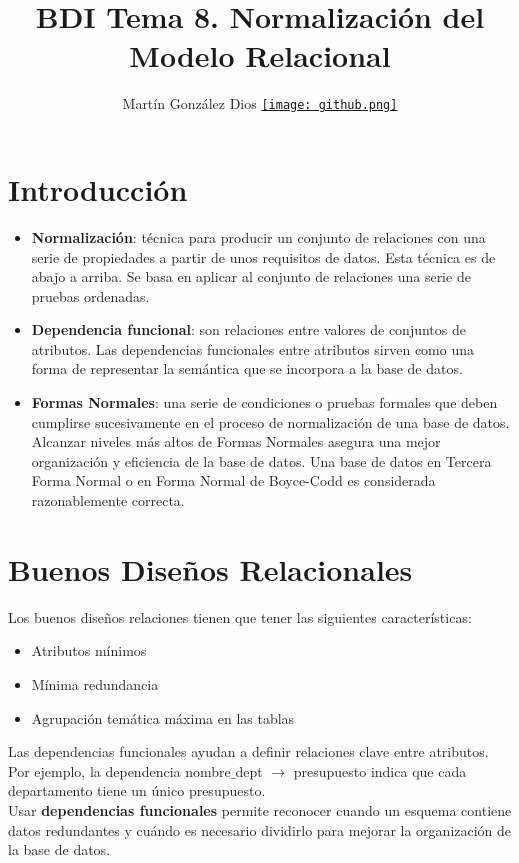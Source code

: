 \documentclass{article}
\title{BDI Tema 8. Normalización del Modelo Relacional}
\author{Martín González Dios 
\href{https://github.com/martindios}{\texttt{[image: github.png]}}}
\begin{document}
\maketitle

\section{Introducción}
\begin{itemize}
    \item \textbf{Normalización}: técnica para producir un conjunto de relaciones con una serie de propiedades a partir de unos requisitos de datos. Esta técnica es de abajo a arriba. Se basa en aplicar al conjunto de relaciones una serie de pruebas ordenadas.
    \item \textbf{Dependencia funcional}: son relaciones entre valores de conjuntos de atributos. Las dependencias funcionales entre atributos sirven como una forma de representar la semántica que se incorpora a la base de datos.
    \item \textbf{Formas Normales}: una serie de condiciones o pruebas formales que deben cumplirse sucesivamente en el proceso de normalización de una base de datos. Alcanzar niveles más altos de Formas Normales asegura una mejor organización y eficiencia de la base de datos. Una base de datos en Tercera Forma Normal o en Forma Normal de Boyce-Codd es considerada razonablemente correcta.
\end{itemize}

\section{Buenos Diseños Relacionales}
Los buenos diseños relaciones tienen que tener las siguientes características:
\begin{itemize}
    \item Atributos mínimos
    \item Mínima redundancia
    \item Agrupación temática máxima en las tablas
\end{itemize}

Las dependencias funcionales ayudan a definir relaciones clave entre atributos. Por ejemplo, la dependencia nombre$\_$dept $\xrightarrow{}$ presupuesto indica que cada departamento tiene un único presupuesto. \\
Usar \textbf{dependencias funcionales} permite reconocer cuando un esquema contiene datos redundantes y cuándo es necesario dividirlo para mejorar la organización de la base de datos.
\end{document}
